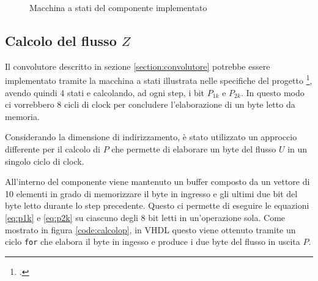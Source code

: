 \begin{figure}[!ht]
    \centering
    \caption{Macchina a stati del componente implementato}
    \label{fig:statemachine}
\end{figure}

\subsection{Calcolo del flusso \texorpdfstring{$Z$}{}}
\label{section:calcolodiz}

Il convolutore descritto in sezione \ref{section:convolutore} potrebbe essere implementato tramite la macchina a stati illustrata nelle specifiche del progetto \footcite{specifichedelprogetto}, avendo quindi 4 stati e calcolando, ad ogni step, i bit $P_{1k}$ e $P_{2k}$. In questo modo ci vorrebbero 8 cicli di clock per concludere l'elaborazione di un byte letto da memoria.

Considerando la dimensione di indirizzamento, è stato utilizzato un approccio differente per il calcolo di $P$ che permette di elaborare un byte del flusso $U$ in un singolo ciclo di clock.

All'interno del componente viene mantenuto un buffer composto da un vettore di 10 elementi in grado di memorizzare il byte in ingresso e gli ultimi due bit del byte letto durante lo step precedente. Questo ci permette di eseguire le equazioni \ref{eq:p1k} e \ref{eq:p2k} su ciascuno degli 8 bit letti in un'operazione sola. Come mostrato in figura \ref{code:calcolop}, in VHDL questo viene ottenuto tramite un ciclo \verb|for| che elabora il byte in ingesso e produce i due byte del flusso in uscita $P$.


